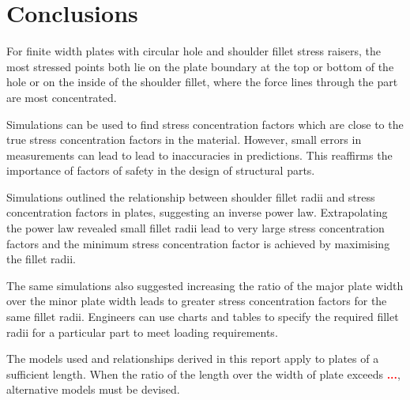 \documentclass[a4paper,11pt,twocolumn]{article}
\begin{document}
\section{Conclusions}

For finite width plates with circular hole and shoulder fillet stress raisers,
the most stressed points both lie on the plate boundary at the top or bottom of
the hole or on the inside of the shoulder fillet, where the force lines through
the part are most concentrated.

Simulations can be used to find stress concentration factors which are close to
the true stress concentration factors in the material. However, small errors in
measurements can lead to lead to inaccuracies in predictions. This reaffirms the
importance of factors of safety in the design of structural parts.

Simulations outlined the relationship between shoulder fillet radii and stress
concentration factors in plates, suggesting an inverse power law. Extrapolating
the power law revealed small fillet radii lead to very large stress
concentration factors and the minimum stress concentration factor is achieved by
maximising the fillet radii.

The same simulations also suggested increasing the ratio of the major plate
width over the minor plate width leads to greater stress concentration factors
for the same fillet radii. Engineers can use charts and tables to specify the
required fillet radii for a particular part to meet loading requirements.

The models used and relationships derived in this report apply to plates of a
sufficient length. When the ratio of the length over the width of plate exceeds 
\textcolor{red}{\bf\LARGE...}, alternative models must be devised.

\printbibliography
\end{document}
